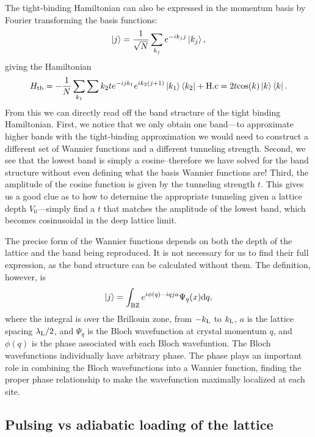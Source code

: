 The tight-binding Hamiltonian can also be expressed in the momentum basis by Fourier transforming the basis functions:
\begin{equation}
\mathinner{|{j}\rangle} = \frac{1}{\sqrt{N}}\sum_{k_j} e^{-i k_j j}\mathinner{|{k_j}\rangle},
\end{equation}
giving the Hamiltonian
\begin{equation}
H_{\rm tb} = - \frac{1}{N}\sum_{k_1}\sum{k_2} t e^{-i j k_1} e^{i k_2 (j+1)} \mathinner{|{k_1}\rangle}\mathinner{\langle{k_2}|} + {\rm H.c} = 2 t {\rm cos}(k)\mathinner{|{k}\rangle}\mathinner{\langle{k}|}.
\end{equation}  
From this we can directly read off the band structure of the tight binding Hamiltonian. First, we notice that we only obtain one band---to approximate higher bands with the tight-binding approximation we would need to construct a different set of Wannier functions and a different tunneling strength. Second, we see that the lowest band is simply a cosine--therefore we have solved for the band structure without even defining what the basis Wannier functions are! Third, the amplitude of the cosine function is given by the tunneling strength $t$. This gives us a good clue as to how to determine the appropriate tunneling given a lattice depth $V_0$---simply find a $t$ that matches the amplitude of the lowest band, which becomes cosinusoidal in the deep lattice limit. 

The precise form of the Wannier functions depends on both the depth of the lattice and the band being reproduced. It is not necessary for us to find their full expression, as the band structure can be calculated without them. The definition, however, is
\begin{equation}
\mathinner{|{j}\rangle} = \int_{\rm BZ} e^{i \phi(q) - i q j a}\Psi_q(x) {\rm d} q,
\end{equation}
where the integral is over the Brillouin zone, from $-k_{\rm L}$ to $k_{\rm L}$, $a$ is the lattice spacing $\lambda_{\rm L}/2$, and $\Psi_q$ is the Bloch wavefunction at crystal momentum $q$, and $\phi(q)$ is the phase associated with each Bloch wavefuntion. The Bloch wavefunctions individually have arbitrary phase. The phase plays an important role in combining the Bloch wavefunctions into a Wannier function, finding the proper phase relationship to make the wavefunction maximally localized at each site\cite{Marzari2012}. 

\subsection{Pulsing vs adiabatic loading of the lattice}\label{sec:LatticeCalib}

